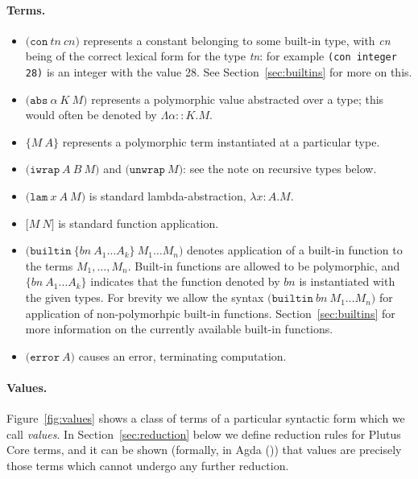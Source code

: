 \documentclass[a4paper]{article}
\newcommand{\keyword}[1]{\texttt{#1}}
\newcommand{\construct}[1]{\texttt{(} #1 \texttt{)}}
\newcommand{\con}[2]{\construct{\keyword{con} ~ #1 ~ #2}}
\newcommand{\abs}[3]{\construct{\keyword{abs} ~ #1 ~ #2 ~ #3}}
\newcommand{\inst}[2]{\texttt{\{}#1 ~ #2\texttt{\}}}
\newcommand{\lam}[3]{\construct{\keyword{lam} ~ #1 ~ #2 ~ #3}}
\newcommand{\app}[2]{\texttt{[} #1 ~ #2 \texttt{]}}
\newcommand{\iwrap}[3]{\construct{\keyword{iwrap} ~ #1 ~ #2 ~ #3}}
\newcommand{\unwrap}[1]{\construct{\keyword{unwrap} ~ #1}}
\newcommand{\builtin}[3]{\construct{\keyword{builtin} ~ \texttt{\{} \mathit{#1} ~ #2 \texttt{\}} ~ #3}}
\newcommand{\error}[1]{\construct{\keyword{error} ~ #1}}
\begin{document}
\paragraph{Terms.}
\begin{itemize}
\item $\con{tn}{cn}$ represents a constant belonging to some built-in
  type, with \textit{cn} being of the correct lexical form for the type \textit{tn}:
  for example \texttt{(con integer 28)} is an integer with the value 28.
  See Section~\ref{sec:builtins} for more on this.
\item $\abs{\alpha}{K}{M}$ represents a polymorphic value abstracted
  over a type; this would often be denoted by $\Lambda\alpha{::}K.M$.
\item $\inst{M}{A}$ represents a polymorphic term instantiated at a particular type.
\item $\iwrap{A}{B}{M}$ and $\unwrap{M}$: see the note on recursive types below.
\item $\lam{x}{A}{M}$ is standard lambda-abstraction, $\lambda{}x{:}{A}.{M}$.
\item $\app{M}{N}$ is standard function application.
\item $\builtin{bn}{A_1 \ldots A_k}{M_1 \ldots M_n}$ denotes application of a built-in function
to the terms $M_1, \ldots, M_n$.
Built-in functions are allowed to be polymorphic, and
$\texttt{\{}\mathit{bn} ~ A_1 \ldots A_k\texttt{\}}$ indicates that the
function denoted by $\mathit{bn}$ is instantiated with the given
types.  For brevity we allow the syntax
$\construct{\keyword{builtin} ~ \mathit{bn} ~ M_1 \ldots M_n}$ for
application of non-polymorhpic built-in functions.
Section~\ref{sec:builtins} for more information on the currently
available built-in functions.
\item $\error{A}$ causes an error, terminating computation.
\end{itemize}

\paragraph{Values.} Figure~\ref{fig:values} shows a class of terms of a particular
syntactic form which we call \textit{values}.  In
Section~\ref{sec:reduction} below we define reduction rules for Plutus
Core terms, and it can be shown (formally, in
Agda (\cite{Plutus-metatheory-repo})) that values are precisely those
terms which cannot undergo any further reduction.
\end{document}

